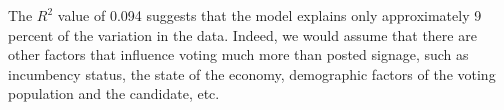 \documentclass[12pt,letterpaper]{article}
\begin{document}
\begin{enumerate}
	\vspace{.05cm}
		The $R^2$ value of 0.094 suggests that the model explains only approximately 9 percent of the variation in the data. Indeed, we would assume that there are other factors that influence voting much more than posted signage, such as incumbency status, the state of the economy, demographic factors of the voting population and the candidate, etc.\\
	\vspace{.05cm}
\end{enumerate}  
\end{document}
